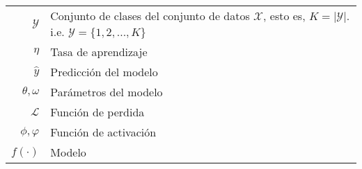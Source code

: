 \begin{table}[H]
\begin{center}
\begin{tabularx}{\textwidth}{|r|X|}
            $ \mathcal{Y} $                                                                  & Conjunto de clases del conjunto de datos $\mathcal{X}$, esto es, $\textit{K} = \lvert \mathcal{Y} \rvert$. \newline i.e. \scriptsize{${ \mathcal{Y} = \{1,2,...,\textit{K}\}}$} \\
            $ \eta $                                                                         & Tasa de aprendizaje                                                                                                                                                             \\
            $ \hat{y} $                                                                      & Predicción del modelo                                                                                                                                                           \\
            $ \theta, \omega $                                                               & Parámetros del modelo                                                                                                                                                           \\
            $ \mathcal{L} $                                                                  & Función de perdida                                                                                                                                                              \\
            $ \phi ,\varphi $                                                                & Función de activación                                                                                                                                                           \\
            $ f\left(\cdot\right) $                                                          & Modelo                                                                                                                                                                          \\

\end{tabularx}
\end{center}
\end{table}
